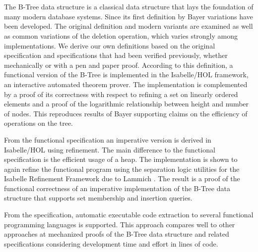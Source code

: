 \chapter{\abstractname}

The B-Tree data structure is a classical data structure
that lays the foundation of many modern database systems.
Since its first definition by Bayer \parencite{DBLP:journals/acta/BayerM72}
variations have been developed.
The original definition and modern variants are examined
as well as common variations of the deletion operation,
which varies strongly among implementations.
We derive our own definitions based on the original specification
and specifications that had been verified previously,
whether mechanically or with a pen and paper proof.
According to this definition, a functional version of the B-Tree
is implemented in the Isabelle/HOL framework,
an interactive automated theorem prover.
The implementation is complemented by a proof of its correctness
with respect to refining a set on linearly ordered elements
and a proof of the logarithmic relationship between height and number of nodes.
This reproduces results of Bayer \parencite{DBLP:journals/acta/BayerM72}
supporting claims on the efficiency of
operations on the tree.

From the functional specification an imperative version is
derived in Isabelle/HOL using refinement.
The main difference to the functional specification is the efficient
usage of a heap.
The implementation is shown to again refine the functional program
using the separation logic utilities for the Isabelle Refinement Framework due to
Lammich \parencite{DBLP:journals/jar/Lammich19}.
The result is a proof of the functional correctness
of an imperative implementation of the B-Tree data structure
that supports set membership and insertion queries.

From the specification, automatic executable code extraction to
several functional programming languages is supported.
This approach compares well to other approaches at mechanized
proofs of the B-Tree data structure and related specifications
considering development time and effort in lines of code.



